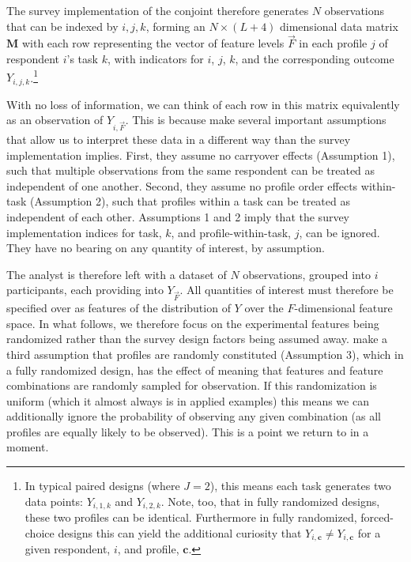 \documentclass[a4paper,12pt]{article}\usepackage[]{graphicx}\usepackage[]{color}
\begin{document}
The survey implementation of the conjoint therefore generates $N$ observations that can be indexed by $i,j,k$, forming an $N \times(L+4)$ dimensional data matrix $\mathbf{M}$ with each row representing the vector of feature levels $\vec{F}$ in each profile $j$ of respondent $i$'s task $k$, with indicators for $i$, $j$, $k$, and the corresponding outcome $Y_{i,j,k}$.\footnote{In typical paired designs (where $J=2$), this means each task generates two data points: $Y_{i,1,k}$ and $Y_{i,2,k}$. Note, too, that in fully randomized designs, these two profiles can be identical. Furthermore in fully randomized, forced-choice designs this can yield the additional curiosity that $Y_{i,\mathbf{c}} \neq Y_{i,\mathbf{c}}$ for a given respondent, $i$, and profile, $\mathbf{c}$.}

With no loss of information, we can think of each row in this matrix equivalently as an observation of $Y_{i,\vec{F}}$. This is because \citet{HainmuellerHopkinsYamamoto2014} make several important assumptions that allow us to interpret these data in a different way than the survey implementation implies. First, they assume no carryover effects (Assumption 1), such that multiple observations from the same respondent can be treated as independent of one another. Second, they assume no profile order effects within-task (Assumption 2), such that profiles within a task can be treated as independent of each other. Assumptions 1 and 2 imply that the survey implementation indices for task, $k$, and profile-within-task, $j$, can be ignored. They have no bearing on any quantity of interest, by assumption. 

The analyst is therefore left with a dataset of $N$ observations, grouped into $i$ participants, each providing into $Y_{\vec{F}}$. All quantities of interest must therefore be specified over as features of the distribution of $Y$ over the $F$-dimensional feature space. In what follows, we therefore focus on the experimental features being randomized rather than the survey design factors being assumed away. \citet{HainmuellerHopkinsYamamoto2014} make a third assumption that profiles are randomly constituted (Assumption 3), which in a fully randomized design, has the effect of meaning that features and feature combinations are randomly sampled for observation. If this randomization is uniform (which it almost always is in applied examples) this means we can additionally ignore the probability of observing any given combination (as all profiles are equally likely to be observed). This is a point we return to in a moment.
\end{document}
